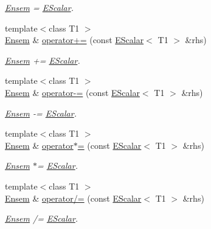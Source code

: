 \begin{DoxyCompactItemize}
\begin{DoxyCompactList}\small\item\em \mbox{\hyperlink{classENSEM_1_1Ensem}{Ensem}} = \mbox{\hyperlink{classENSEM_1_1EScalar}{E\+Scalar}}. \end{DoxyCompactList}\item 
{\footnotesize template$<$class T1 $>$ }\\\mbox{\hyperlink{classENSEM_1_1Ensem}{Ensem}} \& \mbox{\hyperlink{classENSEM_1_1Ensem_a3b36653814508e90b22543a3f1b465d5}{operator+=}} (const \mbox{\hyperlink{classENSEM_1_1EScalar}{E\+Scalar}}$<$ T1 $>$ \&rhs)
\begin{DoxyCompactList}\small\item\em \mbox{\hyperlink{classENSEM_1_1Ensem}{Ensem}} += \mbox{\hyperlink{classENSEM_1_1EScalar}{E\+Scalar}}. \end{DoxyCompactList}\item 
{\footnotesize template$<$class T1 $>$ }\\\mbox{\hyperlink{classENSEM_1_1Ensem}{Ensem}} \& \mbox{\hyperlink{classENSEM_1_1Ensem_a33710df08404883ee7790d2b67542971}{operator-\/=}} (const \mbox{\hyperlink{classENSEM_1_1EScalar}{E\+Scalar}}$<$ T1 $>$ \&rhs)
\begin{DoxyCompactList}\small\item\em \mbox{\hyperlink{classENSEM_1_1Ensem}{Ensem}} -\/= \mbox{\hyperlink{classENSEM_1_1EScalar}{E\+Scalar}}. \end{DoxyCompactList}\item 
{\footnotesize template$<$class T1 $>$ }\\\mbox{\hyperlink{classENSEM_1_1Ensem}{Ensem}} \& \mbox{\hyperlink{classENSEM_1_1Ensem_abacb93dfca393ddb29f317d35e2fff7f}{operator$\ast$=}} (const \mbox{\hyperlink{classENSEM_1_1EScalar}{E\+Scalar}}$<$ T1 $>$ \&rhs)
\begin{DoxyCompactList}\small\item\em \mbox{\hyperlink{classENSEM_1_1Ensem}{Ensem}} $\ast$= \mbox{\hyperlink{classENSEM_1_1EScalar}{E\+Scalar}}. \end{DoxyCompactList}\item 
{\footnotesize template$<$class T1 $>$ }\\\mbox{\hyperlink{classENSEM_1_1Ensem}{Ensem}} \& \mbox{\hyperlink{classENSEM_1_1Ensem_a32bf70c0844ce98695151457bf9df018}{operator/=}} (const \mbox{\hyperlink{classENSEM_1_1EScalar}{E\+Scalar}}$<$ T1 $>$ \&rhs)
\begin{DoxyCompactList}\small\item\em \mbox{\hyperlink{classENSEM_1_1Ensem}{Ensem}} /= \mbox{\hyperlink{classENSEM_1_1EScalar}{E\+Scalar}}. \end{DoxyCompactList}\item 

\end{DoxyCompactItemize}

